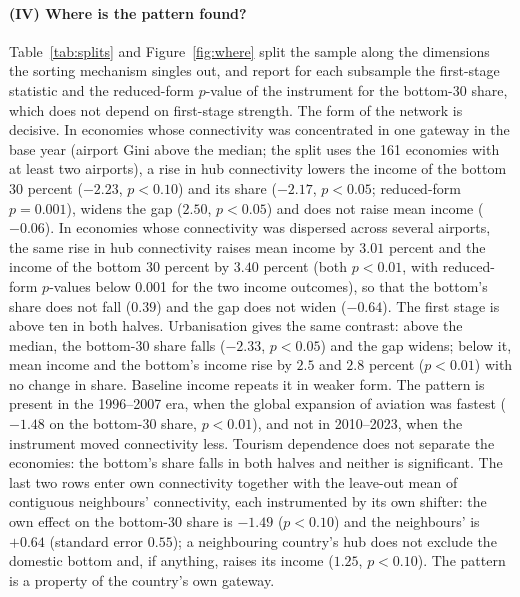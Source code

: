 \begin{table}[p]
\begin{minipage}{\linewidth}
\end{minipage}
\end{table}


\paragraph{(IV) Where is the pattern found?}
Table~\ref{tab:splits} and Figure~\ref{fig:where} split the sample along the dimensions the sorting mechanism singles out, and report for each subsample the first-stage statistic and the reduced-form $p$-value of the instrument for the bottom-30 share, which does not depend on first-stage strength. The form of the network is decisive. In economies whose connectivity was concentrated in one gateway in the base year (airport Gini above the median; the split uses the 161 economies with at least two airports), a rise in hub connectivity lowers the income of the bottom 30 percent ($-2.23$, $p<0.10$) and its share ($-2.17$, $p<0.05$; reduced-form $p=0.001$), widens the gap ($2.50$, $p<0.05$) and does not raise mean income ($-0.06$). In economies whose connectivity was dispersed across several airports, the same rise in hub connectivity raises mean income by $3.01$ percent and the income of the bottom 30 percent by $3.40$ percent (both $p<0.01$, with reduced-form $p$-values below 0.001 for the two income outcomes), so that the bottom's share does not fall ($0.39$) and the gap does not widen ($-0.64$). The first stage is above ten in both halves. Urbanisation gives the same contrast: above the median, the bottom-30 share falls ($-2.33$, $p<0.05$) and the gap widens; below it, mean income and the bottom's income rise by $2.5$ and $2.8$ percent ($p<0.01$) with no change in share. Baseline income repeats it in weaker form. The pattern is present in the 1996--2007 era, when the global expansion of aviation was fastest ($-1.48$ on the bottom-30 share, $p<0.01$), and not in 2010--2023, when the instrument moved connectivity less. Tourism dependence does not separate the economies: the bottom's share falls in both halves and neither is significant. The last two rows enter own connectivity together with the leave-out mean of contiguous neighbours' connectivity, each instrumented by its own shifter: the own effect on the bottom-30 share is $-1.49$ ($p<0.10$) and the neighbours' is $+0.64$ (standard error $0.55$); a neighbouring country's hub does not exclude the domestic bottom and, if anything, raises its income ($1.25$, $p<0.10$). The pattern is a property of the country's own gateway.

